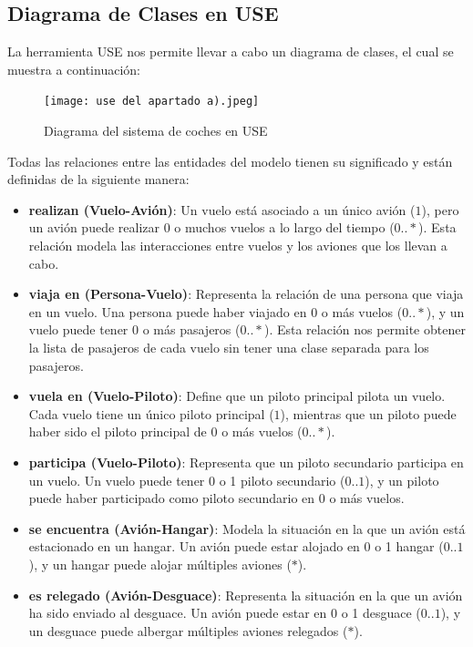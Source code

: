\documentclass[12pt.a4paper]{article}
\begin{document}
\subsection{Diagrama de Clases en USE}
La herramienta USE nos permite llevar a cabo un diagrama de clases, el cual se muestra a continuación:
\begin{figure}[H]
     \texttt{[image: use del apartado a).jpeg]}
     \caption{Diagrama del sistema de coches en USE}
     \label{Diagrama del sistema de coches en USE}
\end{figure}
\vspace{1.0cm}

Todas las relaciones entre las entidades del modelo tienen su significado y están definidas de la siguiente manera:
\begin{itemize}
\item \textbf{realizan (Vuelo-Avión)}: Un vuelo está asociado a un único avión (\(1\)), pero un avión puede realizar 0 o muchos vuelos a lo largo del tiempo (\(0..*\)). Esta relación modela las interacciones entre vuelos y los aviones que los llevan a cabo.
  
\item \textbf{viaja en (Persona-Vuelo)}: Representa la relación de una persona que viaja en un vuelo. Una persona puede haber viajado en 0 o más vuelos (\(0..*\)), y un vuelo puede tener 0 o más pasajeros (\(0..*\)). Esta relación nos permite obtener la lista de pasajeros de cada vuelo sin tener una clase separada para los pasajeros.

\item \textbf{vuela en (Vuelo-Piloto)}: Define que un piloto principal pilota un vuelo. Cada vuelo tiene un único piloto principal (\(1\)), mientras que un piloto puede haber sido el piloto principal de 0 o más vuelos (\(0..*\)).

\item \textbf{participa (Vuelo-Piloto)}: Representa que un piloto secundario participa en un vuelo. Un vuelo puede tener 0 o 1 piloto secundario (\(0..1\)), y un piloto puede haber participado como piloto secundario en 0 o más vuelos.

\item \textbf{se encuentra (Avión-Hangar)}: Modela la situación en la que un avión está estacionado en un hangar. Un avión puede estar alojado en 0 o 1 hangar (\(0..1\)), y un hangar puede alojar múltiples aviones (\(*\)).

\item \textbf{es relegado (Avión-Desguace)}: Representa la situación en la que un avión ha sido enviado al desguace. Un avión puede estar en 0 o 1 desguace (\(0..1\)), y un desguace puede albergar múltiples aviones relegados (\(*\)).


\end{itemize}
\end{document}
